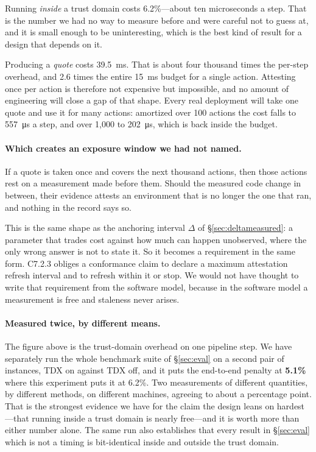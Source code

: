 \documentclass[11pt]{article}
\begin{document}
Running \emph{inside} a trust domain costs 6.2\%---about ten microseconds a
step. That is the number we had no way to measure before and were careful not
to guess at, and it is small enough to be uninteresting, which is the best kind
of result for a design that depends on it.

Producing a \emph{quote} costs \SI{39.5}{\milli\second}. That is about four
thousand times the per-step overhead, and 2.6 times the entire
\SI{15}{\milli\second} budget for a single action. Attesting once per action is
therefore not expensive but impossible, and no amount of engineering will close
a gap of that shape. Every real deployment will take one quote and use it for
many actions: amortized over 100 actions the cost falls to
\SI{557}{\micro\second} a step, and over 1{,}000 to \SI{202}{\micro\second},
which is back inside the budget.

\paragraph{Which creates an exposure window we had not named.} If a quote is
taken once and covers the next thousand actions, then those actions rest on a
measurement made before them. Should the measured code change in between, their
evidence attests an environment that is no longer the one that ran, and nothing
in the record says so.

This is the same shape as the anchoring interval $\Delta$ of
\S\ref{sec:deltameasured}: a parameter that trades cost against how much can
happen unobserved, where the only wrong answer is not to state it. So it
becomes a requirement in the same form. C7.2.3 obliges a conformance claim to
declare a maximum attestation refresh interval and to refresh within it or stop.
We would not have thought to write that requirement from the software model,
because in the software model a measurement is free and staleness never arises.

\paragraph{Measured twice, by different means.} The figure above is the
trust-domain overhead on one pipeline step. We have separately run the whole
benchmark suite of \S\ref{sec:eval} on a second pair of instances, TDX on
against TDX off, and it puts the end-to-end penalty at \textbf{5.1\%} where
this experiment puts it at 6.2\%. Two measurements of different quantities, by
different methods, on different machines, agreeing to about a percentage point.
That is the strongest evidence we have for the claim the design leans on
hardest---that running inside a trust domain is nearly free---and it is worth
more than either number alone. The same run also establishes that every result
in \S\ref{sec:eval} which is not a timing is bit-identical inside and outside
the trust domain.
\end{document}
